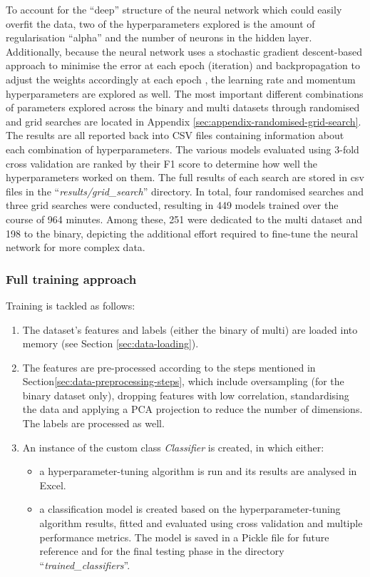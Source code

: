 \documentclass[letterpaper,12pt]{article}
\begin{document}
To account for the ``deep'' structure of the neural network which could easily overfit the data, two of the hyperparameters explored is the amount of regularisation ``alpha'' and the number of neurons in the hidden layer. Additionally, because the neural network uses a stochastic gradient descent-based approach to minimise the error at each epoch (iteration) and backpropagation to adjust the weights accordingly at each epoch \cite{russell2016artificial}, the learning rate and momentum hyperparameters are explored as well. The most important different combinations of parameters explored across the binary and multi datasets through randomised and grid searches are located in Appendix \ref{sec:appendix-randomised-grid-search}.\\

The results are all reported back into CSV files containing information about each combination of hyperparameters. The various models evaluated using  3-fold cross validation are ranked by their F1 score to determine how well the hyperparameters worked on them. The full results of each search are stored in csv files in the ``\textit{results/grid\_search}'' directory. In total, four randomised searches and three grid searches were conducted, resulting in 449 models trained over the course of 964 minutes. Among these, 251 were dedicated to the multi dataset and 198 to the binary, depicting the additional effort required to fine-tune the neural network for more complex data.

\subsubsection{Full training approach}
\label{sec:full-training-approach}

Training is tackled as follows:
\begin{enumerate}
    \item The dataset's features and labels (either the binary of multi) are loaded into memory (see  Section \ref{sec:data-loading}).
    \item The features are pre-processed according to the steps mentioned in Section\ref{sec:data-preprocessing-steps}, which include oversampling (for the binary dataset only), dropping features with low correlation, standardising the data and applying a PCA projection  to reduce the number of dimensions. The labels are processed as well.
    \item An instance of the custom class \textit{Classifier} is created, in which either:
    \begin{itemize}
        \item a hyperparameter-tuning algorithm is run and its results are analysed in Excel.
        \item a classification model is created based on the hyperparameter-tuning algorithm results, fitted and evaluated using cross validation and multiple performance metrics. The model is saved in a Pickle file for future reference and for the final testing phase in the directory ``\textit{trained\_classifiers}''.
    \end{itemize}
\end{enumerate}
\end{document}
